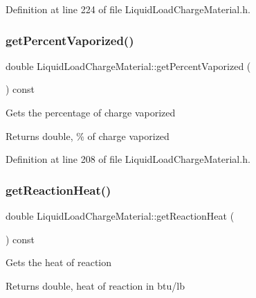Definition at line 224 of file Liquid\+Load\+Charge\+Material.\+h.

\mbox{\label{class_liquid_load_charge_material_a8e55b0df0a0551671636bcf169228dca}} 
\subsubsection{\texorpdfstring{get\+Percent\+Vaporized()}{getPercentVaporized()}}
{\footnotesize\ttfamily double Liquid\+Load\+Charge\+Material\+::get\+Percent\+Vaporized (\begin{DoxyParamCaption}{ }\end{DoxyParamCaption}) const\hspace{0.3cm}{\ttfamily [inline]}}

Gets the percentage of charge vaporized \begin{DoxyReturn}{Returns}
double, \% of charge vaporized 
\end{DoxyReturn}


Definition at line 208 of file Liquid\+Load\+Charge\+Material.\+h.

\mbox{\label{class_liquid_load_charge_material_a2f0c26e789e98efd1e8fd0c8741ddd92}} 
\subsubsection{\texorpdfstring{get\+Reaction\+Heat()}{getReactionHeat()}}
{\footnotesize\ttfamily double Liquid\+Load\+Charge\+Material\+::get\+Reaction\+Heat (\begin{DoxyParamCaption}{ }\end{DoxyParamCaption}) const\hspace{0.3cm}{\ttfamily [inline]}}

Gets the heat of reaction \begin{DoxyReturn}{Returns}
double, heat of reaction in btu/lb 
\end{DoxyReturn}


